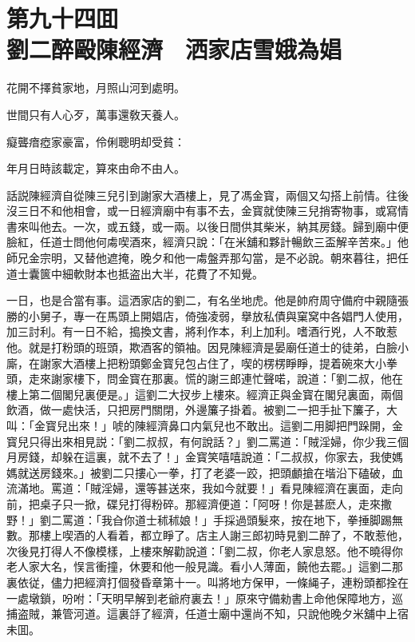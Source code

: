 
\chapter*{第九十四囬　\\劉二醉毆陳經濟　洒家店雪娥為娼}


\begin{myquote}
花開不擇貧家地，月照山河到處明。

世間只有人心歹，萬事還敎天養人。

癡聾瘖瘂家豪富，伶俐聰明却受貧：

年月日時該載定，算來由命不由人。
\end{myquote}

話説陳經濟自從陳三兒引到謝家大酒樓上，見了馮金寳，兩個又勾搭上前情。往後沒三日不和他相會，或一日經濟廟中有事不去，金寳就使陳三兒捎寄物事，或寫情書來叫他去。一次，或五錢，或一兩。以後日間供其柴米，納其房錢。歸到廟中便臉紅，任道士問他何䖏喫酒來，經濟只說：「在米舖和夥計暢飲三盃解辛苦來。」他師兄金宗明，又替他遮掩，晚夕和他一䖏盤弄那勾當，是不必說。朝來暮往，把任道士囊篋中細軟財本也抵盗出大半，花費了不知覺。

一日，也是合當有事。這洒家店的劉二，有名坐地虎。他是帥府周守備府中親隨張勝的小舅子，專一在馬頭上開娼店，倚強凌弱，擧放私債與窠窝中各娼門人使用，加三討利。有一日不給，搗換文書，將利作本，利上加利。嗜酒行兇，人不敢惹他。就是打粉頭的班頭，欺酒客的領袖。因見陳經濟是晏廟任道士的徒弟，白臉小廝，在謝家大酒樓上把粉頭鄭金寳兒包占住了，喫的楞楞睜睜，提着碗來大小拳頭，走來謝家樓下，問金寳在那裏。慌的謝三郎連忙聲喏，說道：「劉二叔，他在樓上第二個閣兒裏便是。」這劉二大扠步上樓來。經濟正與金寳在閣兒裏面，兩個飲酒，做一處快活，只把房門關閉，外邊簾子掛着。被劉二一把手扯下簾子，大叫：「金寳兒出來！」唬的陳經濟鼻口内氣兒也不敢出。這劉二用脚把門跺開，金寳兒只得出來相見説：「劉二叔叔，有何說話？」劉二罵道：「賊淫婦，你少我三個月房錢，却躲在這裏，就不去了！」金寳笑嘻嘻說道：「二叔叔，你家去，我使媽媽就送房錢來。」被劉二只摟心一拳，打了老婆一跤，把頭顱搶在堦沿下磕破，血流滿地。罵道：「賊淫婦，還等甚送來，我如今就要！」看見陳經濟在裏面，走向前，把桌子只一掀，碟兒打得粉碎。那經濟便道：「阿呀！你是甚麽人，走來撒野！」劉二罵道：「我㒲你道士秫秫娘！」手採過頭髮來，按在地下，拳捶脚踢無數。那樓上喫酒的人看着，都立睜了。店主人謝三郎初時見劉二醉了，不敢惹他，次後見打得人不像模樣，上樓來解勸說道：「劉二叔，你老人家息怒。他不曉得你老人家大名，悮言衝撞，休要和他一般見識。看小人薄面，饒他去罷。」這劉二那裏依従，儘力把經濟打個發昏章第十一。叫將地方保甲，一條䋲子，連粉頭都拴在一處墩鎖，吩咐：「天明早解到老爺府裏去！」原來守備勑書上命他保障地方，巡捕盗賊，兼管河道。這裏㧱了經濟，任道士廟中還尚不知，只說他晚夕米舖中上宿未囬。

